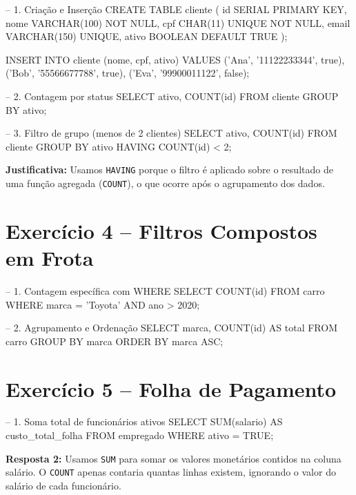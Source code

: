 \documentclass[12pt]{article}
\begin{document}
\begin{sqlcode}
-- 1. Criação e Inserção
CREATE TABLE cliente (
    id SERIAL PRIMARY KEY,
    nome VARCHAR(100) NOT NULL,
    cpf CHAR(11) UNIQUE NOT NULL,
    email VARCHAR(150) UNIQUE,
    ativo BOOLEAN DEFAULT TRUE
);

INSERT INTO cliente (nome, cpf, ativo) VALUES 
('Ana', '11122233344', true),
('Bob', '55566677788', true),
('Eva', '99900011122', false);

-- 2. Contagem por status
SELECT ativo, COUNT(id) 
FROM cliente 
GROUP BY ativo;

-- 3. Filtro de grupo (menos de 2 clientes)
SELECT ativo, COUNT(id) 
FROM cliente 
GROUP BY ativo
HAVING COUNT(id) < 2;
\end{sqlcode}
\textbf{Justificativa:} Usamos \texttt{HAVING} porque o filtro é aplicado sobre o resultado de uma função agregada (\texttt{COUNT}), o que ocorre após o agrupamento dos dados.

\hrulefill

\section*{Exercício 4 – Filtros Compostos em Frota}



\begin{sqlcode}
-- 1. Contagem específica com WHERE
SELECT COUNT(id) 
FROM carro 
WHERE marca = 'Toyota' AND ano > 2020;

-- 2. Agrupamento e Ordenação
SELECT marca, COUNT(id) AS total
FROM carro
GROUP BY marca
ORDER BY marca ASC;
\end{sqlcode}

\hrulefill

\section*{Exercício 5 – Folha de Pagamento}



\begin{sqlcode}
-- 1. Soma total de funcionários ativos
SELECT SUM(salario) AS custo_total_folha
FROM empregado
WHERE ativo = TRUE;
\end{sqlcode}
\textbf{Resposta 2:} Usamos \texttt{SUM} para somar os valores monetários contidos na coluna salário. O \texttt{COUNT} apenas contaria quantas linhas existem, ignorando o valor do salário de cada funcionário.

\hrulefill
\end{document}
